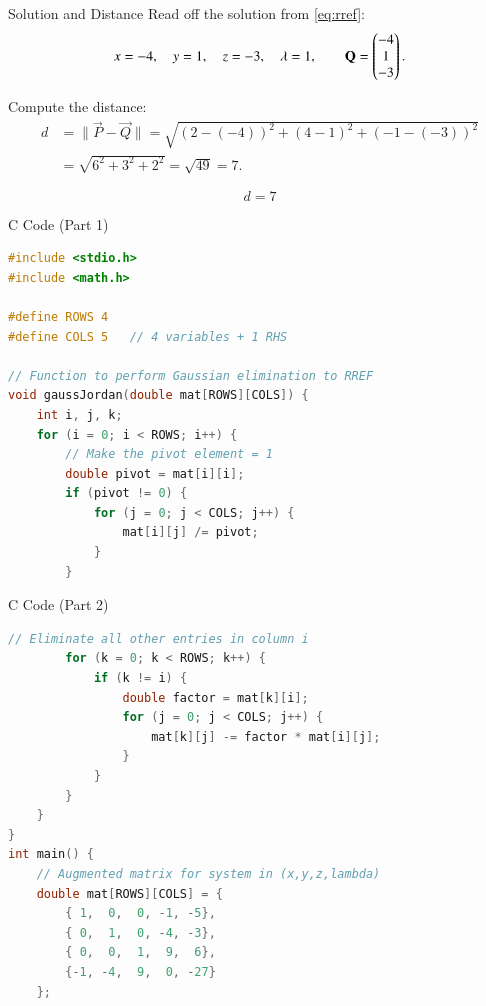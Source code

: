 \documentclass{beamer}
\begin{document}
\begin{frame}{Solution and Distance}
Read off the solution from \eqref{eq:rref}:
\begin{equation}\label{eq:sol}
x=-4,\quad y=1,\quad z=-3,\quad \lambda=1,
\qquad \mathbf{Q}=\begin{pmatrix}-4\\1\\-3\end{pmatrix}.
\end{equation}

Compute the distance:
\begin{equation}\label{eq:distance}
\begin{aligned}
d &= \|\vec{P}-\vec{Q}\|
= \sqrt{(2-(-4))^2+(4-1)^2+(-1-(-3))^2}\\[4pt]
  &= \sqrt{6^2+3^2+2^2}=\sqrt{49}=7.
\end{aligned}
\end{equation}

\[
\boxed{\,d=7\,}
\]
\end{frame}

\begin{frame}[fragile]{C Code (Part 1)}
\begin{lstlisting}[language=C]
#include <stdio.h>
#include <math.h>

#define ROWS 4
#define COLS 5   // 4 variables + 1 RHS

// Function to perform Gaussian elimination to RREF
void gaussJordan(double mat[ROWS][COLS]) {
    int i, j, k;
    for (i = 0; i < ROWS; i++) {
        // Make the pivot element = 1
        double pivot = mat[i][i];
        if (pivot != 0) {
            for (j = 0; j < COLS; j++) {
                mat[i][j] /= pivot;
            }
        }
\end{lstlisting}
\end{frame}

\begin{frame}[fragile]{C Code (Part 2)}
\begin{lstlisting}[language=C]
        // Eliminate all other entries in column i
        for (k = 0; k < ROWS; k++) {
            if (k != i) {
                double factor = mat[k][i];
                for (j = 0; j < COLS; j++) {
                    mat[k][j] -= factor * mat[i][j];
                }
            }
        }
    }
}
int main() {
    // Augmented matrix for system in (x,y,z,lambda)
    double mat[ROWS][COLS] = {
        { 1,  0,  0, -1, -5},
        { 0,  1,  0, -4, -3},
        { 0,  0,  1,  9,  6},
        {-1, -4,  9,  0, -27}
    };
\end{lstlisting}
\end{frame}
\end{document}
